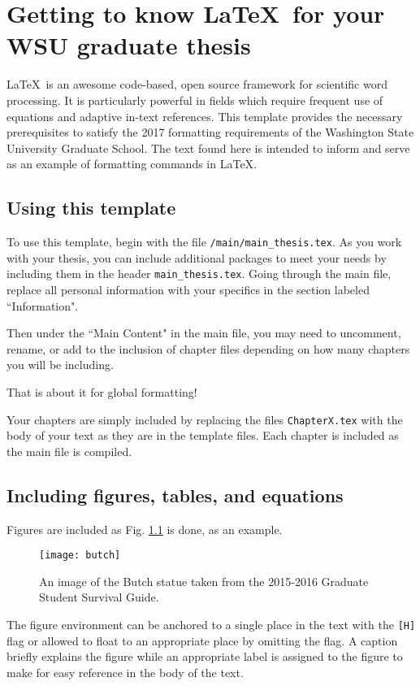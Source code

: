 \chapter{Getting to know \LaTeX\ for your WSU graduate thesis}

\LaTeX\ is an awesome code-based, open source framework for scientific word processing. It is particularly powerful in fields which require frequent use of equations and adaptive in-text references. This template provides the necessary prerequisites to satisfy the 2017 formatting requirements of the Washington State University Graduate School. The text found here is intended to inform and serve as an example of formatting commands in \LaTeX.

\section{Using this template}

To use this template, begin with the file \verb|/main/main_thesis.tex|. As you work with your thesis, you can include additional packages to meet your needs by including them in the header \verb|main_thesis.tex|. Going through the main file, replace all personal information with your specifics in the section labeled ``Information".

Then under the ``Main Content" in the main file, you may need to uncomment, rename, or add to the inclusion of chapter files depending on how many chapters you will be including.

That is about it for global formatting!

Your chapters are simply included by replacing the files \verb|ChapterX.tex| with the body of your text as they are in the template files. Each chapter is included as the main file is compiled.

\section{Including figures, tables, and equations}

Figures are included as Fig. \ref{fig:butch} is done, as an example.
\begin{figure}[H] %
    \centering
    \texttt{[image: butch]}
    \caption{An image of the Butch statue taken from the 2015-2016 Graduate Student Survival Guide.}
    \label{fig:butch}
\end{figure}
The figure environment can be anchored to a single place in the text with the \verb|[H]| flag or allowed to float to an appropriate place by omitting the flag. A caption briefly explains the figure while an appropriate label is assigned to the figure to make for easy reference in the body of the text.

